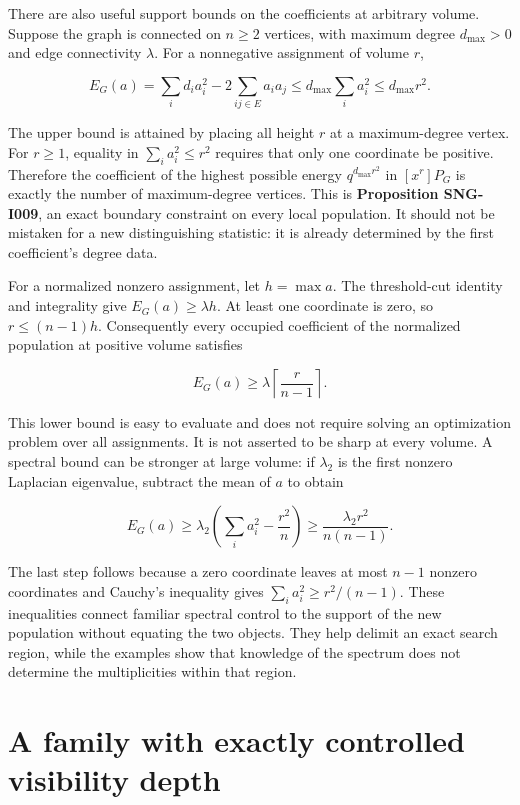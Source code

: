 \documentclass[
  11pt,
  a4paper,
]{report}
\begin{document}
There are also useful support bounds on the coefficients at arbitrary
volume. Suppose the graph is connected on \(n\ge2\) vertices, with
maximum degree \(d_{\max}>0\) and edge connectivity \(\lambda\). For a
nonnegative assignment of volume \(r\),

\[
E_G(a)=\sum_i d_i a_i^2-2\sum_{ij\in E}a_ia_j
\le d_{\max}\sum_i a_i^2\le d_{\max}r^2.
\]

The upper bound is attained by placing all height \(r\) at a
maximum-degree vertex. For \(r\ge1\), equality in
\(\sum_i a_i^2\le r^2\) requires that only one coordinate be positive.
Therefore the coefficient of the highest possible energy
\(q^{d_{\max}r^2}\) in \([x^r]P_G\) is exactly the number of
maximum-degree vertices. This is \textbf{Proposition SNG-I009}, an exact
boundary constraint on every local population. It should not be mistaken
for a new distinguishing statistic: it is already determined by the
first coefficient's degree data.

For a normalized nonzero assignment, let \(h=\max a\). The threshold-cut
identity and integrality give \(E_G(a)\ge\lambda h\). At least one
coordinate is zero, so \(r\le(n-1)h\). Consequently every occupied
coefficient of the normalized population at positive volume satisfies

\[
E_G(a)\ge\lambda\left\lceil\frac r{n-1}\right\rceil.
\]

This lower bound is easy to evaluate and does not require solving an
optimization problem over all assignments. It is not asserted to be
sharp at every volume. A spectral bound can be stronger at large volume:
if \(\lambda_2\) is the first nonzero Laplacian eigenvalue, subtract the
mean of \(a\) to obtain

\[
E_G(a)\ge\lambda_2\left(\sum_i a_i^2-\frac{r^2}n\right)
\ge\frac{\lambda_2r^2}{n(n-1)}.
\]

The last step follows because a zero coordinate leaves at most \(n-1\)
nonzero coordinates and Cauchy's inequality gives
\(\sum_i a_i^2\ge r^2/(n-1)\). These inequalities connect familiar
spectral control to the support of the new population without equating
the two objects. They help delimit an exact search region, while the
examples show that knowledge of the spectrum does not determine the
multiplicities within that region.

\hypertarget{a-family-with-exactly-controlled-visibility-depth}{%
\section{A family with exactly controlled visibility
depth}\label{a-family-with-exactly-controlled-visibility-depth}}
\end{document}
